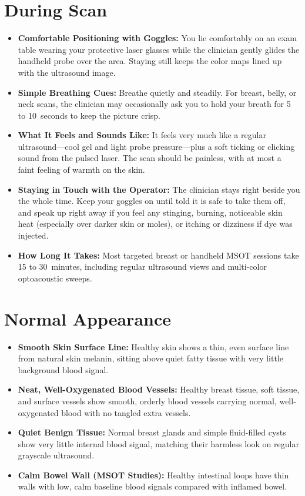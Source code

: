 \section{During Scan}
\begin{itemize}
  \item \textbf{Comfortable Positioning with Goggles:} You lie comfortably on an exam table wearing your protective laser glasses while the clinician gently glides the handheld probe over the area. Staying still keeps the color maps lined up with the ultrasound image.
  \item \textbf{Simple Breathing Cues:} Breathe quietly and steadily. For breast, belly, or neck scans, the clinician may occasionally ask you to hold your breath for 5 to 10~seconds to keep the picture crisp.
  \item \textbf{What It Feels and Sounds Like:} It feels very much like a regular ultrasound---cool gel and light probe pressure---plus a soft ticking or clicking sound from the pulsed laser. The scan should be painless, with at most a faint feeling of warmth on the skin.
  \item \textbf{Staying in Touch with the Operator:} The clinician stays right beside you the whole time. Keep your goggles on until told it is safe to take them off, and speak up right away if you feel any stinging, burning, noticeable skin heat (especially over darker skin or moles), or itching or dizziness if dye was injected.
  \item \textbf{How Long It Takes:} Most targeted breast or handheld MSOT sessions take 15 to 30~minutes, including regular ultrasound views and multi-color optoacoustic sweeps.
\end{itemize}

\section{Normal Appearance}
\begin{itemize}
  \item \textbf{Smooth Skin Surface Line:} Healthy skin shows a thin, even surface line from natural skin melanin, sitting above quiet fatty tissue with very little background blood signal.
  \item \textbf{Neat, Well-Oxygenated Blood Vessels:} Healthy breast tissue, soft tissue, and surface vessels show smooth, orderly blood vessels carrying normal, well-oxygenated blood with no tangled extra vessels.
  \item \textbf{Quiet Benign Tissue:} Normal breast glands and simple fluid-filled cysts show very little internal blood signal, matching their harmless look on regular grayscale ultrasound.
  \item \textbf{Calm Bowel Wall (MSOT Studies):} Healthy intestinal loops have thin walls with low, calm baseline blood signals compared with inflamed bowel.
\end{itemize}

